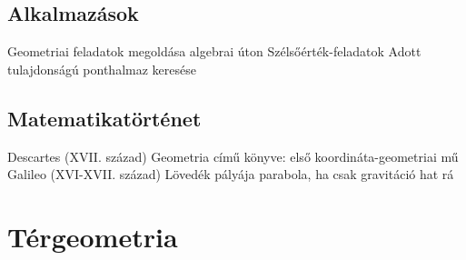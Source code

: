 \documentclass[twoside,12pt]{report}
\theoremstyle{definition}
\begin{document}
\section{Alkalmazások}
	\begin{outline}
		\1 Geometriai feladatok megoldása algebrai úton
			\2 Szélsőérték-feladatok
			\2 Adott tulajdonságú ponthalmaz keresése
	\end{outline}
\section{Matematikatörténet}
	\begin{outline}
		\1 Descartes (XVII. század)
			\2 Geometria című könyve: első koordináta-geometriai mű
		\1 Galileo (XVI-XVII. század)
			\2 Lövedék pályája parabola, ha csak gravitáció hat rá
	\end{outline}
\chapter{Térgeometria}
\end{document}
